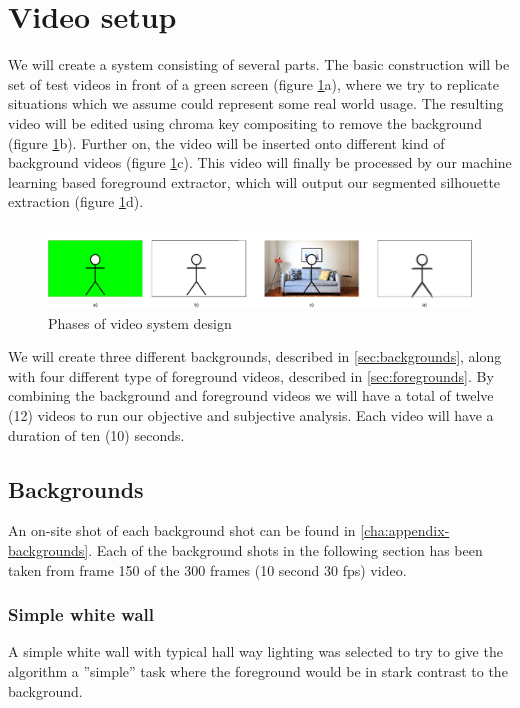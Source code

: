 \section{Video setup}
We will create a system consisting of several parts. The basic construction will be set of test videos in front of a green screen (figure \ref{fig:videos}a), where we try to replicate situations which we assume could represent some real world usage. The resulting video will be edited using chroma key compositing to remove the background (figure \ref{fig:videos}b). Further on, the video will be inserted onto different kind of background videos (figure \ref{fig:videos}c). This video will finally be processed by our machine learning based foreground extractor, which will output our segmented silhouette extraction (figure \ref{fig:videos}d). 

\begin{figure}[H]
  \centering
  \includegraphics[width=\textwidth]{img/video_setup/video_system_design.pdf}
  \caption{Phases of video system design}
  \label{fig:videos}
\end{figure}

We will create three different backgrounds, described in \autoref{sec:backgrounds}, along with four different type of foreground videos, described in \autoref{sec:foregrounds}. By combining the background and foreground videos we will have a total of twelve (12) videos to run our objective and subjective analysis. Each video will have a duration of ten (10) seconds.

\subsection{Backgrounds}\label{sec:backgrounds}

An on-site shot of each background shot can be found in \autoref{cha:appendix-backgrounds}. Each of the background shots in the following section has been taken from frame 150 of the 300 frames (10 second 30 fps) video.

\subsubsection{Simple white wall}
A simple white wall with typical hall way lighting was selected to try to give the algorithm a ''simple'' task where the foreground would be in stark contrast to the background.

